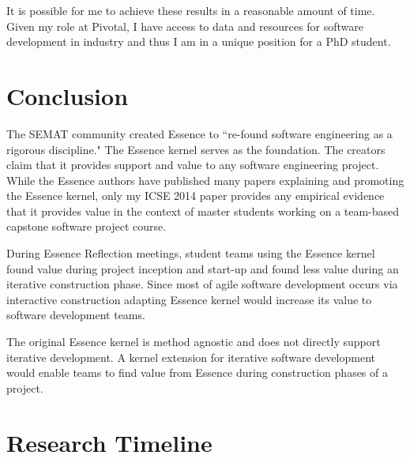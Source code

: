 \documentclass[preprint,12pt,3p]{elsarticle}
\begin{document}
It is possible for me to achieve these results in a reasonable amount of time. 
Given my role at Pivotal, I have access to data and resources for software development in industry and thus I am in a unique position for a PhD student.  

\section{Conclusion}
\label{Conclusions}

The SEMAT community created Essence to ``re-found software engineering as a rigorous discipline." The Essence kernel serves as the foundation. The creators claim that it provides support and value to any software engineering project. While the Essence authors have published many papers explaining and promoting the Essence kernel, only my  ICSE 2014 paper provides any empirical evidence that it provides value in the context of master students working on a team-based capstone software project course. 

During Essence Reflection meetings, student teams using the Essence kernel found value during project inception and start-up and found less value during an iterative construction phase. Since most of agile software development occurs via interactive construction adapting Essence kernel would increase its value to software development teams.

The original Essence kernel is method agnostic and does not directly support iterative development. A kernel extension for iterative software development would enable teams to find value from Essence during construction phases of a project.

\appendix
\section{Research Timeline}
\label{appendix}
\end{document}

